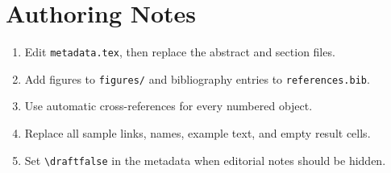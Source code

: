 \section{Authoring Notes}\label{app:notes}
\begin{enumerate}
  \item Edit \texttt{metadata.tex}, then replace the abstract and section files.
  \item Add figures to \texttt{figures/} and bibliography entries to
    \texttt{references.bib}.
  \item Use automatic cross-references for every numbered object.
  \item Replace all sample links, names, example text, and empty result cells.
  \item Set \verb|\draftfalse| in the metadata when editorial notes should be hidden.
\end{enumerate}

